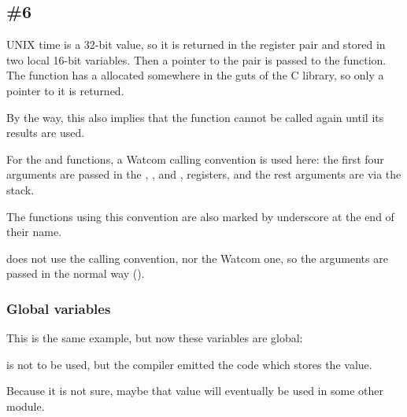 \subsection{\Example{} \#6}






UNIX time is a 32-bit value, so it is returned in the  register pair and stored in two local 16-bit variables.
Then a pointer to the pair is passed to the
 function.
The  function has a  
allocated somewhere in the guts of the C library, so only a pointer to it is returned. 

By the way, this also implies that the function cannot be called again until its results are used.

For the  and  
functions, a Watcom calling convention is used here:
the first four arguments are passed in the , ,  and , 
registers, and the rest arguments are via the stack.

The functions using this convention are also marked by underscore at the end of their name.

does not use the  calling convention, nor the Watcom one,
so the arguments are passed in the normal  way ().

\subsubsection{Global variables}

This is the same example, but now these variables are global:





 is not to be used, but the compiler emitted the code which stores the value.

Because it is not sure, maybe that value will eventually be used in some other module.
